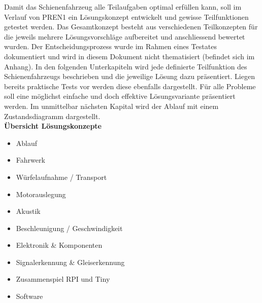 \documentclass[../../main.tex]{subfiles}
\begin{document}
Damit das Schienenfahrzeug alle Teilaufgaben optimal erfüllen kann, soll im Verlauf von PREN1 ein Lösungskonzept entwickelt und gewisse Teilfunktionen getestet werden. Das Gesamtkonzept besteht aus verschiedenen Teilkonzepten für die jeweils mehrere Lösungsvorschläge aufbereitet und anschliessend bewertet wurden. Der Entscheidungsprozess wurde im Rahmen eines Testates dokumentiert und wird in diesem Dokument nicht thematisiert (befindet sich im Anhang). In den folgenden Unterkapiteln wird jede definierte Teilfunktion des Schienenfahrzeugs beschrieben und die jeweilige Lösung dazu präsentiert. Liegen bereits praktische Tests vor werden diese ebenfalls dargestellt. Für alle Probleme soll eine möglichst einfache und doch effektive Lösungsvariante präsentiert werden. Im unmittelbar nächsten Kapital wird der Ablauf mit einem Zustandsdiagramm dargestellt.\\

\textbf{Übersicht Lösungskonzepte}
\begin{itemize}
    \item Ablauf
    \item Fahrwerk
    \item Würfelaufnahme / Transport
    \item Motorauslegung
    \item Akustik
    \item Beschleunigung / Geschwindigkeit
    \item Elektronik \& Komponenten
    \item Signalerkennung \& Gleiserkennung
    \item Zusammenspiel RPI und Tiny
    \item Software
\end{itemize}
\end{document}
